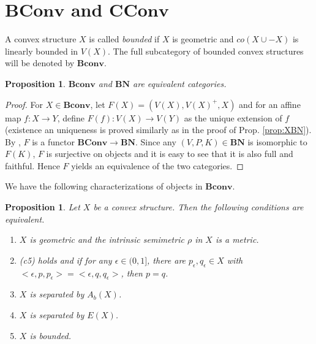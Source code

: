 \documentclass[12pt,letterpaper]{article}
\newtheorem{proposition}[lemma]{Proposition}
\newcommand{\ct}[1]{\mathbf{#1}}
\newcommand{\<}{\langle}
\begin{document}
\section{$\ct{BConv}$ and $\ct{CConv}$}

A convex structure $X$ is called \emph{bounded} if $X$ is geometric and $co(X\cup -X)$ is linearly bounded in $V(X)$.
 The full subcategory of  bounded convex structures will be denoted by $\ct{Bconv}$. 

\begin{proposition} $\ct{Bconv}$ and $\ct{BN}$ are equivalent categories.

\end{proposition}  
\begin{proof}

For $X\in \ct{Bconv}$, let  $F(X)=(V(X),V(X)^+,X)$ and for an affine map $f:X\to Y$, define $F(f): V(X)\to V(Y)$
as the unique extension of $f$ (existence an uniqueness is proved similarly as in the proof of Prop. \ref{prop:XBN}). By 
\cite[Prop. 5]{ovs}, $F$ is a functor $\ct{BConv}\to\ct{BN}$. Since any $(V,P,K)\in \ct{BN}$ is isomorphic to $F(K)$,  $F$ is surjective on objects and it is easy to see that it is also full and faithful. Hence 
 $F$ yields an equivalence of the two categories. 
 

\end{proof}


We have the following characterizations of objects in $\ct{Bconv}$.
\begin{proposition}\label{prop:bounded} Let $X$ be a  convex structure. Then the following conditions  are equivalent.
\begin{enumerate}
\item[(i)] $X$ is geometric and the intrinsic semimetric $\rho$ in $X$ is a metric.
\item[(ii)] (c5) holds and if for any $\epsilon \in (0,1]$, there are $p_\epsilon,q_\epsilon\in X$ with $<\epsilon,p,p_\epsilon>=<\epsilon, q,q_\epsilon>$, then $p=q$. 
\item[(iii)] $X$ is separated by $A_b(X)$.
\item[(iv)] $X$ is separated by $E(X)$.
\item[(v)] $X$ is bounded.
\end{enumerate}

\end{proposition}
\end{document}
